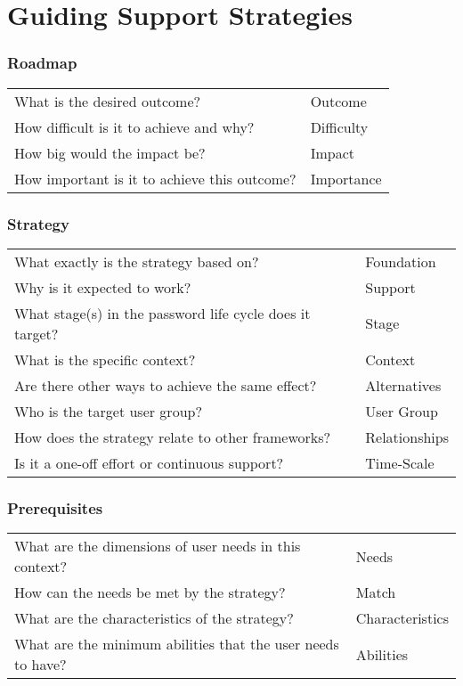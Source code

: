 \section{Guiding Support Strategies}

\subsubsection{Roadmap}
\begin{tabular}{p{14cm}l}
	What is the desired outcome? & Outcome \\
	How difficult is it to achieve and why? & Difficulty \\
	How big would the impact be? & Impact \\
	How important is it to achieve this outcome? & Importance
\end{tabular}

\subsubsection{Strategy}
\begin{tabular}{p{14cm}l}
	What exactly is the strategy based on? & Foundation\\
	Why is it expected to work? & Support\\
	What stage(s) in the password life cycle does it target? & Stage \\
	What is the specific context? & Context \\
	Are there other ways to achieve the same effect? & Alternatives \\
	Who is the target user group? & User Group\\
	How does the strategy relate to other frameworks? & Relationships\\
	Is it a one-off effort or continuous support? & Time-Scale \\
\end{tabular}

\subsubsection{Prerequisites}
\begin{tabular}{p{14cm}l}
	What are the dimensions of user needs in this context? & Needs \\
	How can the needs be met by the strategy? & Match \\
	What are the characteristics of the strategy? & Characteristics\\
	What are the minimum abilities that the user needs to have? & Abilities\\
\end{tabular}

